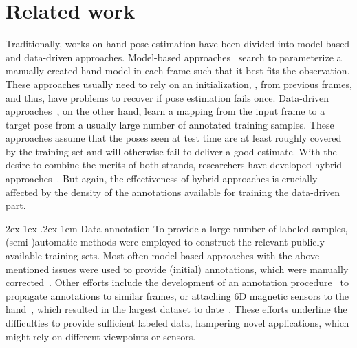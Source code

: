 \documentclass[10pt,twocolumn,letterpaper]{article}
\makeatletter
\renewcommand{\paragraph}{%
  \@startsection{paragraph}{4}%
  {\z@}{2ex \@plus 1ex \@minus .2ex}{-1em}%
  {\normalfont\normalsize\bfseries}%
}
\makeatother
\begin{document}
\section{Related work}
Traditionally, works on hand pose estimation have been divided into
model-based and data-driven approaches.
Model-based approaches~\cite{Gorce2011pami_modelbasedhape,Melax2013gi_dynamicshape,
Oikonomidis2011bmvc,Roditakis2017bmvc_constrainedsampling,Wu2001iccv_handarticulations} 
search to parameterize a manually created hand model in each frame 
such that it best fits the observation.
These approaches usually need to rely on an initialization, \eg, from previous frames,
and thus, have problems to recover if pose estimation fails once.
Data-driven approaches~\cite{Guo2017arxiv_goodpractices,Keskin2012eccv_multilayeredrf,
Oberweger2017iccvw_deeppriorpp,Tang2014cvpr_lrf}, 
on the other hand, learn a mapping from the input frame to a target pose from a
usually large number of annotated training samples.
These approaches assume that the poses seen at test time 
are at least roughly covered by the training set and will otherwise
fail to deliver a good estimate.
With the desire to combine the merits of both strands, 
researchers have developed hybrid 
approaches~\cite{Mueller2017iccv_realtimeeg,Poier2015bmvc_hybriduncertainties,
Taylor2016siggraph,Ye2016eccv_attentionhybridhape,Zhou16ijcai_modelbaseddeephape}. 
But again, the effectiveness of hybrid approaches is crucially affected by the density 
of the annotations available for training the data-driven part.

\paragraph{Data annotation}
To provide a large number of labeled samples,
(semi-)automatic methods were employed 
to construct the relevant publicly available training sets.
Most often model-based approaches with the above mentioned issues
were used to provide (initial) annotations, which were manually 
corrected~\cite{Sun2015cvpr_cascadedhaperegression,Tang2014cvpr_lrf,Tompson2014tog}.
Other efforts include the development of an annotation 
procedure~\cite{Oberweger2016cvpr_anno} to propagate annotations to similar frames, or 
attaching 6D magnetic sensors to the hand~\cite{Wetzler2015bmvc_fingertip,Yuan2017cvpr_bighand},
which resulted in the largest dataset to date~\cite{Yuan2017cvpr_bighand}.
These efforts underline the difficulties to provide sufficient labeled data, 
hampering novel applications, which might rely on different viewpoints or sensors.
\end{document}
